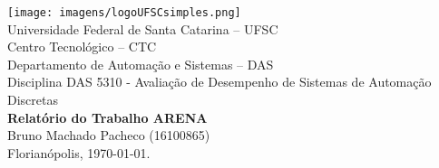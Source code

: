 \documentclass[a4paper,11pt]{article}
\begin{document}
	\thispagestyle{empty}
\begin{center}
	\texttt{[image: imagens/logoUFSCsimples.png]} \\
	{\Large Universidade Federal de Santa Catarina -- UFSC} \\
	{\Large Centro Tecnológico -- CTC} \\
	{\Large Departamento de Automação e Sistemas -- DAS} \\
	\vspace{1cm}
	{\large Disciplina DAS 5310 - Avaliação de Desempenho de Sistemas de Automação Discretas} \\
	\vfill
	\large{\textbf{Relatório do Trabalho ARENA} \\
	} 
	\vspace{1cm}
    Bruno Machado Pacheco (16100865) \\
    \vfill
	Florianópolis, \today.
\end{center}

\clearpage

\tableofcontents

\clearpage



\newpage


\newpage


\newpage


\newpage
\end{document}
